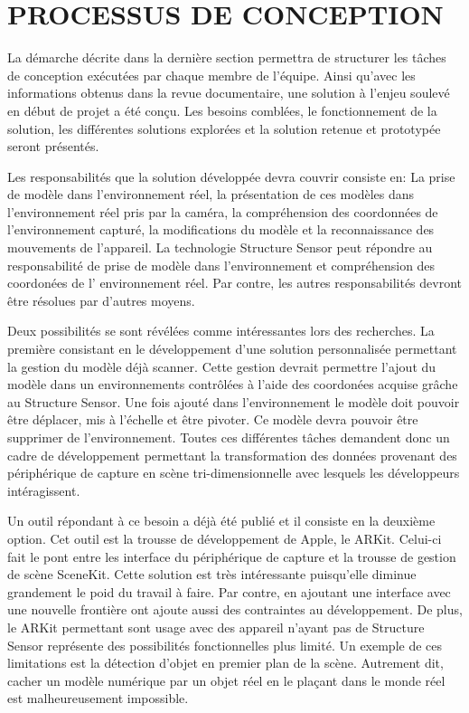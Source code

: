\documentclass[letterpaper,twoside,12pt,french]{report}
\begin{document}
\chapter*{\uppercase{Processus de conception}}
La démarche décrite dans la dernière section permettra de structurer les tâches de conception
exécutées par chaque membre de l'équipe. Ainsi qu'avec les informations obtenus dans la revue
documentaire, une solution à l'enjeu soulevé en début de projet a été conçu. Les besoins comblées,
le fonctionnement de la solution, les différentes solutions explorées et la solution retenue et
prototypée seront présentés.
\par
Les responsabilités que la solution développée devra couvrir consiste en: La prise de modèle dans
l'environnement réel, la présentation de ces modèles dans l'environnement réel pris par la caméra,
la compréhension des coordonnées de l'environnement capturé, la modifications du modèle et la
reconnaissance des mouvements de l'appareil. La technologie Structure Sensor peut répondre au
responsabilité de prise de modèle dans l'environnement et compréhension des coordonées de l'
environnement réel. Par contre, les autres responsabilités devront être résolues par d'autres
moyens.
\par
Deux possibilités se sont révélées comme intéressantes lors des recherches. La première consistant
en le développement d'une solution personnalisée permettant la gestion du modèle déjà scanner.
Cette gestion devrait permettre l'ajout du modèle dans un environnements contrôlées à l'aide des
coordonées acquise grâche au Structure Sensor. Une fois ajouté dans l'environnement le modèle doit 
pouvoir être déplacer, mis à l'échelle et être pivoter. Ce modèle devra pouvoir être supprimer de
l'environnement. Toutes ces différentes tâches demandent donc un cadre de développement permettant
la transformation des données provenant des périphérique de capture en scène tri-dimensionnelle
avec lesquels les développeurs intéragissent.
\par
Un outil répondant à ce besoin a déjà été publié et il consiste en la deuxième option. Cet outil
est la trousse de développement de Apple, le ARKit. Celui-ci fait le pont entre les interface du
périphérique de capture et la trousse de gestion de scène SceneKit. Cette solution est très
intéressante puisqu'elle diminue grandement le poid du travail à faire. Par contre, en ajoutant une
interface avec une nouvelle frontière ont ajoute aussi des contraintes au développement. De plus,
le ARKit permettant sont usage avec des appareil n'ayant pas de Structure Sensor représente des
possibilités fonctionnelles plus limité. Un exemple de ces limitations est la détection d'objet
en premier plan de la scène. Autrement dit, cacher un modèle numérique par un objet réel en le
plaçant dans le monde réel est malheureusement impossible.
\end{document}
